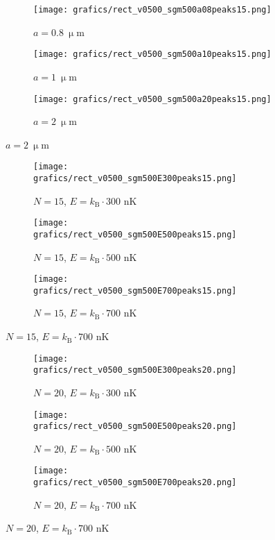 \documentclass[11pt]{article}
\begin{document}
\begin{figure}
	\centering
	\begin{subfigure}[b]{0.3\textwidth}
		\texttt{[image: grafics/rect\_v0500\_sgm500a08peaks15.png]}
		\caption{$a=0.8\ \upmu$m}
		\label{fig:sgm08}
	\end{subfigure}
	\begin{subfigure}[b]{0.3\textwidth}
		\texttt{[image: grafics/rect\_v0500\_sgm500a10peaks15.png]}
		\caption{$a=1\ \upmu$m}
		\label{fig:sgm10}
	\end{subfigure}
	\begin{subfigure}[b]{0.3\textwidth}
		\texttt{[image: grafics/rect\_v0500\_sgm500a20peaks15.png]}
		\caption{$a=2\ \upmu$m}
		\label{fig:sgm20}
	\end{subfigure}
\label{fig:sgm_col1}
\end{figure}

\begin{figure}
	\centering
	\begin{subfigure}[b]{0.3\textwidth}
		\texttt{[image: grafics/rect\_v0500\_sgm500E300peaks15.png]}
		\caption{$N=15$, $E=k_{\mathrm{B}}\cdot 300$ nK}
		\label{fig:sgm_n15_300}
	\end{subfigure}
	\begin{subfigure}[b]{0.3\textwidth}
		\texttt{[image: grafics/rect\_v0500\_sgm500E500peaks15.png]}
		\caption{$N=15$, $E=k_{\mathrm{B}}\cdot 500$ nK}
		\label{fig:sgm_n15_500}
	\end{subfigure}
	\begin{subfigure}[b]{0.3\textwidth}
		\texttt{[image: grafics/rect\_v0500\_sgm500E700peaks15.png]}
		\caption{$N=15$, $E=k_{\mathrm{B}}\cdot 700$ nK}
		\label{fig:sgm_n15_700}
	\end{subfigure}
\label{fig:sgm_col2}
\end{figure}

\begin{figure}
	\centering
	\begin{subfigure}[b]{0.3\textwidth}
		\texttt{[image: grafics/rect\_v0500\_sgm500E300peaks20.png]}
		\caption{$N=20$, $E=k_{\mathrm{B}}\cdot 300$ nK}
		\label{fig:sgm_n20_300}
	\end{subfigure}
	\begin{subfigure}[b]{0.3\textwidth}
		\texttt{[image: grafics/rect\_v0500\_sgm500E500peaks20.png]}
		\caption{$N=20$, $E=k_{\mathrm{B}}\cdot 500$ nK}
		\label{fig:sgm_n20_500}
	\end{subfigure}
	\begin{subfigure}[b]{0.3\textwidth}
		\texttt{[image: grafics/rect\_v0500\_sgm500E700peaks20.png]}
		\caption{$N=20$, $E=k_{\mathrm{B}}\cdot 700$ nK}
		\label{fig:sgm_n20_700}
	\end{subfigure}
\label{fig:sgm_col3}
\end{figure}
\end{document}

